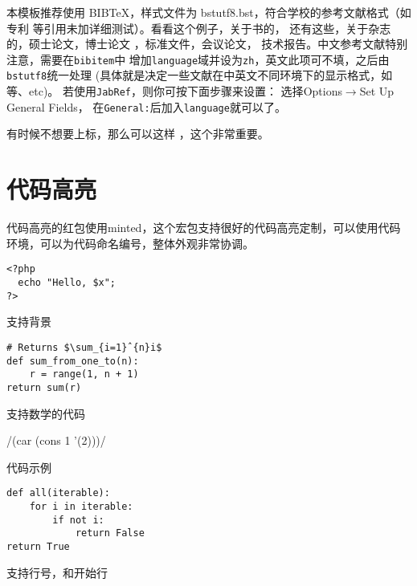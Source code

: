 本模板推荐使用 BIB\TeX，样式文件为 bstutf8.bst，符合学校的参考文献格式（如专利
等引用未加详细测试）。看看这个例子，关于书的，
还有这些，关于杂志的，硕士论文，博士论文
，标准文件，会议论文，%
技术报告。中文参考文献\textsf{特别注意}，需要在\verb|bibitem|中
增加\verb|language|域并设为\verb|zh|，英文此项可不填，之后由\verb|bstutf8|统一处理
(具体就是决定一些文献在中英文不同环境下的显示格式，如等、etc)。
若使用\verb|JabRef|，则你可按下面步骤来设置：
选择\textsf{Options}$\rightarrow$\textsf{Set Up General Fields}，
在\verb|General:|后加入\verb|language|就可以了。

有时候不想要上标，那么可以这样 \cite{shaheshang}，这个非常重要。

\section{代码高亮}
代码高亮的红包使用minted，这个宏包支持很好的代码高亮定制，可以使用代码环境，可以为代码命名编号，整体外观非常协调。

\begin{listing}[!ht]
\small
\begin{verbatim}
<?php
  echo "Hello, $x";
?>
\end{verbatim}
\caption{支持背景}
\end{listing}

\begin{listing}[!ht]
\begin{verbatim} 
# Returns $\sum_{i=1}ˆ{n}i$
def sum_from_one_to(n):
    r = range(1, n + 1)
return sum(r) 
\end{verbatim}
\caption{支持数学的代码}
\end{listing}

\begin{listing}[!ht]
/(car (cons 1 ’(2)))/ 
\caption{代码示例} \label{lst:example}
\end{listing}

\begin{listing}[!ht]
\begin{verbatim}
def all(iterable):
    for i in iterable:
        if not i:
            return False
return True 
\end{verbatim}
\caption{支持行号，和开始行}
\end{listing}


